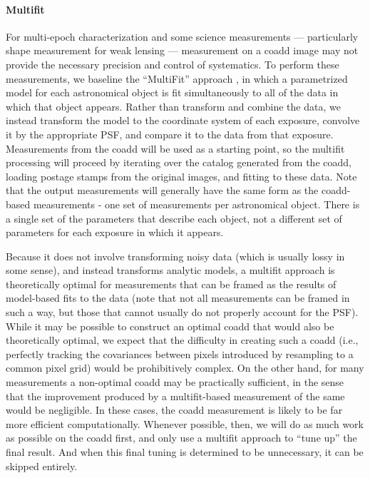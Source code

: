 \documentclass[12pt]{article}
\begin{document}
\paragraph{Multifit}

For multi-epoch characterization and some science measurements --- particularly shape measurement for weak
lensing --- measurement on a coadd image may not provide the necessary
precision and control of systematics.  To perform these measurements,
we baseline the ``MultiFit'' approach \cite{Bosch10, Bosch13}, in which a
parametrized model for each astronomical object is fit simultaneously
to all of the data in which that object appears.  Rather than
transform and combine the data, we instead transform the model to the
coordinate system of each exposure, convolve it by the appropriate
PSF, and compare it to the data from that exposure.  Measurements from
the coadd will be used as a starting point, so the multifit processing
will proceed by iterating over the catalog generated from the coadd,
loading postage stamps from the original images, and fitting to these
data.  Note that the output measurements will generally have the same
form as the coadd-based measurements - one set of measurements per
astronomical object. There is a single set of the
parameters that describe each object, not a different set of parameters
for each exposure in which it appears.

Because it does not involve transforming noisy data (which is usually
lossy in some sense), and instead transforms analytic models, a
multifit approach is theoretically optimal for measurements that can
be framed as the results of model-based fits to the data (note that
not all measurements can be framed in such a way, but those that
cannot usually do not properly account for the PSF). %
While it may be
possible to construct an optimal coadd that would also be
theoretically optimal, we expect that the difficulty in creating such
a coadd (i.e., perfectly tracking the covariances between pixels
introduced by resampling to a common pixel grid) would be prohibitively
complex.  On the other hand, for many measurements a non-optimal coadd
may be practically
sufficient, in the sense that the improvement produced by a
multifit-based measurement of the same would be negligible.  In these
cases, the coadd measurement is likely to be far more efficient
computationally.  Whenever possible, then, we will do as much work as
possible on the coadd first, and only use a multifit approach to ``tune up''
the final result.  And when this final tuning is determined to be
unnecessary, it can be skipped entirely.
\end{document}
